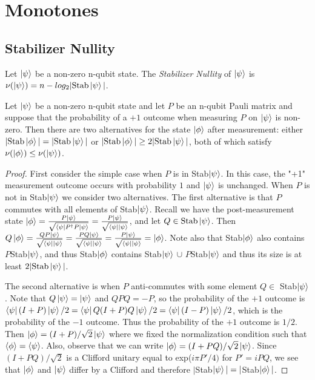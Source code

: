 \documentclass[12pt]{dalthesis}
\begin{document}
\chapter{Monotones}

\section{Stabilizer Nullity}




\begin{definition}
Let $\ket{\psi}$ be a non-zero n-qubit state. The \emph{Stabilizer Nullity} of $\ket{\psi}$ is $\nu(\ket{\psi}) = n - log_2 |\text{Stab}\ket{\psi}|$.
\end{definition}

\begin{proposition}
Let $\ket{\psi}$ be a non-zero n-qubit state and let $P$ be an n-qubit Pauli matrix and suppose that the probability of a $+1$ outcome when measuring $P$ on $\ket{\psi}$ is non-zero. Then there are two alternatives for the state $\ket{\phi}$ after measurement: either $|\text{Stab}\ket{\phi}| = |\text{Stab}\ket{\psi}|$ or $|\text{Stab}\ket{\phi}| \geq 2|\text{Stab}\ket{\psi}|$, both of which satisfy $\nu(\ket{\phi}) \leq \nu(\ket{\psi})$.
\end{proposition}

\begin{proof}
First consider the simple case when $P$ is in Stab$\ket{\psi}$. In this case, the "+1" measurement outcome occurs with probability $1$ and $\ket{\psi}$ is unchanged. When $P$ is not in Stab$\ket{\psi}$ we consider two alternatives. The first alternative is that $P$ commutes with all elements of Stab$\ket{\psi}$. Recall we have the post-measurement state $\ket{\phi} = \frac{P\ket{\psi}}{\sqrt{\bra{\psi}P^{\dag}P\ket{\psi}}} = \frac{P\ket{\psi}}{\sqrt{\bra{\psi}\ket{\psi}}}$, and let $Q \in \text{Stab}\ket{\psi}$. Then $Q\ket{\phi} = \frac{QP\ket{\psi}}{\sqrt{\bra{\psi}\ket{\psi}}} = \frac{PQ\ket{\psi}}{\sqrt{\bra{\psi}\ket{\psi}}} = \frac{P\ket{\psi}}{\sqrt{\bra{\psi}\ket{\psi}}} = \ket{\phi}$. Note also that Stab$\ket{\phi}$ also contains $P$Stab$\ket{\psi}$, and thus Stab$\ket{\phi}$ contains Stab$\ket{\psi}$ $\cup$ $P$Stab$\ket{\psi}$ and thus its size is at least $2| \text{Stab}\ket{\psi}|$.

The second alternative is when $P$ anti-commutes with some element $Q \in$ Stab$\ket{\psi}$. Note that $Q\ket{\psi} = \ket{\psi}$ and $QPQ = -P$, so the probability of the $+1$ outcome is $\bra{\psi}(I+P)\ket{\psi}/2 = \bra{\psi}Q(I+P)Q\ket{\psi}/2 = \bra{\psi}(I-P)\ket{\psi}/2$, which is the probability of the $-1$ outcome. Thus the probability of the $+1$ outcome is $1/2$. Then $\ket{\phi} = (I+P)/\sqrt{2}\ket{\psi}$ where we fixed the normalization condition such that $\braket{\phi} = \braket{\psi}$. Also, observe that we can write $\ket{\phi} = (I+PQ)/\sqrt{2}\ket{\psi}$. Since $(I+PQ)/\sqrt{2}$ is a Clifford unitary equal to exp($i\pi P'/4)$ for $P' = iPQ$, we see that $\ket{\phi}$ and $\ket{\psi}$ differ by a Clifford and therefore $|$Stab$\ket{\psi}| = |$Stab$\ket{\phi}|$.
\end{proof}
\end{document}
